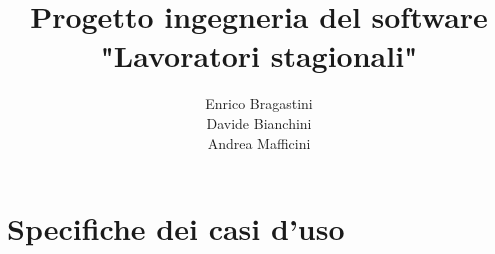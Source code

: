 \documentclass[a4paper, oneside, 12pt]{book}
\begin{document}

\frontmatter

\title{Progetto ingegneria del software \\ "Lavoratori stagionali"}
\author{Enrico Bragastini \\ Davide Bianchini \\ Andrea Mafficini}
\maketitle

\tableofcontents

\chapter{Specifiche dei casi d'uso}
\end{document}
